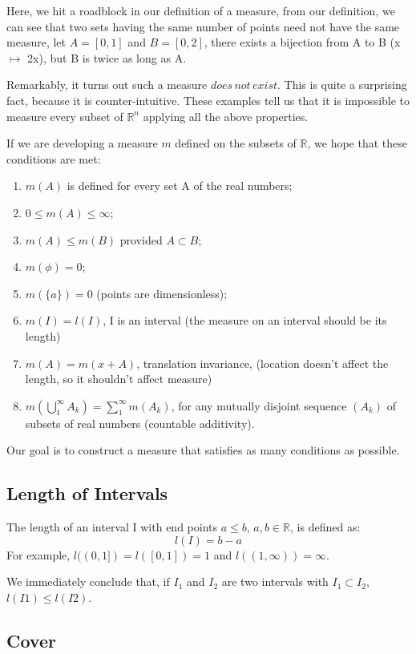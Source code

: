 \documentclass{article}
\begin{document}
Here, we hit a roadblock in our definition of a measure, from our definition, we can see that two sets having the same number of points need not have the same measure, let $A=[0,1]$ and $B=[0,2]$, there exists a bijection from A to B (x $\mapsto$ 2x), but B is twice as long as A.
 
 Remarkably, it turns out such a measure $does \, not \,exist$. This is quite a surprising fact, because it is counter-intuitive. These examples tell us that it is impossible to measure every subset of $\mathbb{R}^n$ applying all the above properties. 
 
 If we are developing a measure $m$ defined on the subsets of $\mathbb{R}$, we hope that these conditions are met:
 \begin{enumerate}
     \item $m(A)$ is defined for every set A of the real numbers;
     \item $0\leq m(A) \leq \infty$;
     \item $m(A) \leq m(B)$ provided $A \subset B$;
     \item $m(\phi) =0 $;
     \item $m(\{a\})=0$ (points are dimensionless);
     \item $m(I)=l(I)$, I is an interval (the measure on an interval should be its length)
     \item $m(A)=m(x+A)$, translation invariance, (location doesn't affect the length, so it shouldn't affect measure)
     \item $m(\bigcup_{1}^{\infty} {A_k}) = \sum_{1}^{\infty}m(A_k)$, for any mutually disjoint sequence $(A_k)$ of subsets of real numbers (countable additivity).
 \end{enumerate}
 Our goal is to construct a measure that satisfies as many conditions as possible.
 
 \subsection{Length of Intervals}
 
 The length of an interval I with end points $a\leq b$, $a,b \in \mathbb{R}$, is defined as:
 $$l(I) = b-a$$
 For example, $l((0,1])=l([0,1])=1$ and $l((1,\infty))=\infty$.
 
 We immediately conclude that, if $I_1$ and $I_2$ are two intervals with $I_1 \subset I_2$, $l(I1) \leq l(I2)$.
 
 \subsection{Cover}
 
\end{document}
